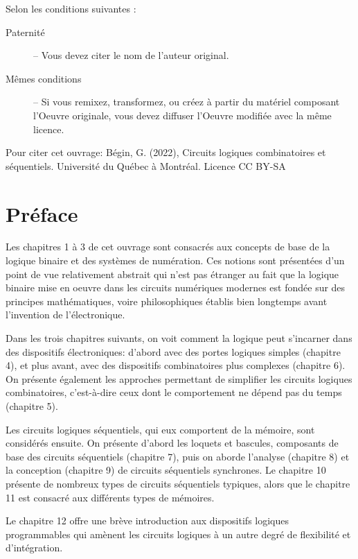 \documentclass[11pt]{article}
\begin{document}
Selon les conditions suivantes :

\begin{description}
\item[{Paternité}] – Vous devez citer le nom de l’auteur original.
\item[{Mêmes conditions}] – Si vous remixez, transformez, ou créez à
partir du matériel composant l'Oeuvre originale, vous devez diffuser
l'Oeuvre modifiée avec la même licence.
\end{description}


Pour citer cet ouvrage: Bégin, G. (2022), Circuits logiques
combinatoires et séquentiels. Université du Québec à Montréal. Licence CC BY-SA

\begin{center}

\end{center}

\section*{Préface}
\label{sec:org29009b8}
Les chapitres 1 à 3 de cet ouvrage sont consacrés aux concepts de base
de la logique binaire et des systèmes de numération. Ces notions sont
présentées d'un point de vue relativement abstrait qui n'est pas
étranger au fait que la logique binaire mise en oeuvre dans les
circuits numériques modernes est fondée sur des principes
mathématiques, voire philosophiques établis bien longtemps avant
l'invention de l'électronique.

Dans les trois chapitres suivants, on voit comment la logique peut
s'incarner dans des dispositifs électroniques: d'abord avec des portes
logiques simples (chapitre 4), et plus avant, avec des dispositifs
combinatoires plus complexes (chapitre 6). On présente également les
approches permettant de simplifier les circuits logiques
combinatoires, c'est-à-dire ceux dont le comportement ne dépend pas du
temps (chapitre 5).

Les circuits logiques séquentiels, qui eux comportent de la
mémoire, sont considérés ensuite. On présente d'abord les loquets et
bascules, composants de base des circuits séquentiels (chapitre 7),
puis on aborde l'analyse (chapitre 8) et la conception (chapitre 9) de
circuits séquentiels synchrones. Le chapitre 10 présente de nombreux
types de circuits séquentiels typiques, alors que le chapitre 11 est
consacré aux différents types de mémoires.

Le chapitre 12 offre une brève introduction aux dispositifs logiques
programmables qui amènent les circuits logiques à un autre degré de
flexibilité et d'intégration.
\end{document}
